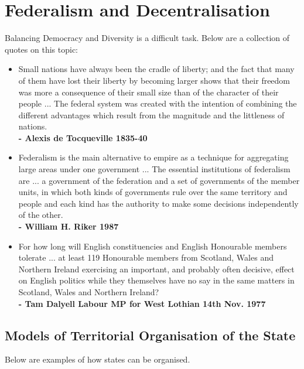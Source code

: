 \documentclass[12pt, letterpaper]{article}
\begin{document}
\section{Federalism and Decentralisation}
Balancing Democracy and Diversity is a difficult task. Below are a collection of quotes on this topic:
\begin{itemize}
	\item Small nations have always been the cradle of liberty; and the fact that many of them have lost their liberty by becoming larger shows that their freedom was more a consequence of their small size than of the character of their people ... The federal system was created with the intention of combining the different advantages which result from the magnitude and the littleness of nations.\\
		\textbf{- Alexis de Tocqueville 1835-40}
	\item Federalism is the main alternative to empire as a technique for aggregating large areas under one government ... The essential institutions of federalism are ... a government of the federation and a set of governments of the member units, in which both kinds of governments rule over the same territory and people and each kind has the authority to make some decisions independently of the other.\\
		\textbf{- William H. Riker 1987}
	\item For how long will English constituencies and English Honourable members tolerate ... at least 119 Honourable members from Scotland, Wales and Northern Ireland exercising an important, and probably often decisive, effect on English politics while they themselves have no say in the same matters in Scotland, Wales and Northern Ireland?\\
		\textbf{- Tam Dalyell Labour MP for West Lothian 14th Nov. 1977}
\end{itemize}

\subsection{Models of Territorial Organisation of the State}
Below are examples of how states can be organised.
\end{document}
